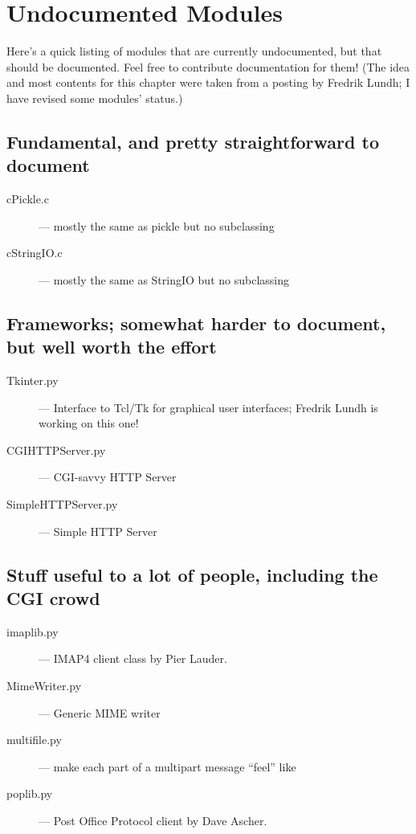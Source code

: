 \chapter{Undocumented Modules}
\label{undoc}

Here's a quick listing of modules that are currently undocumented, but
that should be documented.  Feel free to contribute documentation for
them!  (The idea and most contents for this chapter were taken from a
posting by Fredrik Lundh; I have revised some modules' status.)


\section{Fundamental, and pretty straightforward to document}

\begin{description}
\item[cPickle.c]
--- mostly the same as pickle but no subclassing

\item[cStringIO.c]
--- mostly the same as StringIO but no subclassing
\end{description}


\section{Frameworks; somewhat harder to document, but well worth the effort}

\begin{description}
\item[Tkinter.py]
--- Interface to Tcl/Tk for graphical user interfaces;
Fredrik Lundh is working on this one!

\item[CGIHTTPServer.py]
--- CGI-savvy HTTP Server

\item[SimpleHTTPServer.py]
--- Simple HTTP Server
\end{description}


\section{Stuff useful to a lot of people, including the CGI crowd}

\begin{description}
\item[imaplib.py]
--- IMAP4 client class by Pier Lauder.

\item[MimeWriter.py]
--- Generic MIME writer

\item[multifile.py]
--- make each part of a multipart message ``feel'' like

\item[poplib.py]
--- Post Office Protocol client by Dave Ascher.
\end{description}


